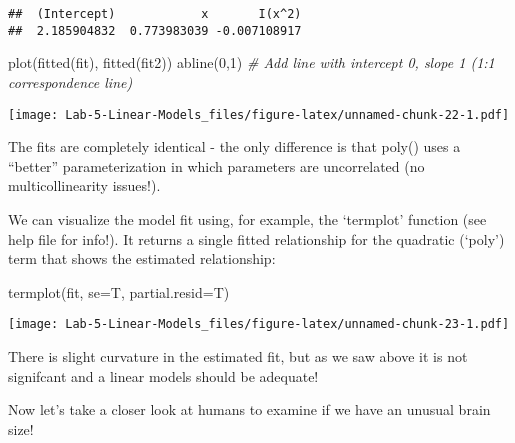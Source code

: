 \documentclass[
]{article}
\newenvironment{Shaded}{\begin{snugshade}}{\end{snugshade}}
\newcommand{\AttributeTok}[1]{\textcolor[rgb]{0.77,0.63,0.00}{#1}}
\newcommand{\CommentTok}[1]{\textcolor[rgb]{0.56,0.35,0.01}{\textit{#1}}}
\newcommand{\DecValTok}[1]{\textcolor[rgb]{0.00,0.00,0.81}{#1}}
\newcommand{\FunctionTok}[1]{\textcolor[rgb]{0.00,0.00,0.00}{#1}}
\newcommand{\NormalTok}[1]{#1}
\newcommand{\OtherTok}[1]{\textcolor[rgb]{0.56,0.35,0.01}{#1}}
\newcommand{\SpecialCharTok}[1]{\textcolor[rgb]{0.00,0.00,0.00}{#1}}
\newcommand{\StringTok}[1]{\textcolor[rgb]{0.31,0.60,0.02}{#1}}
\begin{document}
\begin{verbatim}
##  (Intercept)            x       I(x^2) 
##  2.185904832  0.773983039 -0.007108917
\end{verbatim}

\begin{Shaded}
\begin{Highlighting}[]
\FunctionTok{plot}\NormalTok{(}\FunctionTok{fitted}\NormalTok{(fit), }\FunctionTok{fitted}\NormalTok{(fit2))}
\FunctionTok{abline}\NormalTok{(}\DecValTok{0}\NormalTok{,}\DecValTok{1}\NormalTok{)        }\CommentTok{\# Add line with intercept 0, slope 1 (1:1 correspondence line)}
\end{Highlighting}
\end{Shaded}

\texttt{[image: Lab-5-Linear-Models\_files/figure-latex/unnamed-chunk-22-1.pdf]}

The fits are completely identical - the only difference is that poly()
uses a ``better'' parameterization in which parameters are uncorrelated
(no multicollinearity issues!).

We can visualize the model fit using, for example, the `termplot'
function (see help file for info!). It returns a single fitted
relationship for the quadratic (`poly') term that shows the estimated
relationship:

\begin{Shaded}
\begin{Highlighting}[]
\FunctionTok{termplot}\NormalTok{(fit, }\AttributeTok{se=}\NormalTok{T, }\AttributeTok{partial.resid=}\NormalTok{T)}
\end{Highlighting}
\end{Shaded}

\texttt{[image: Lab-5-Linear-Models\_files/figure-latex/unnamed-chunk-23-1.pdf]}

There is slight curvature in the estimated fit, but as we saw above it
is not signifcant and a linear models should be adequate!

Now let's take a closer look at humans to examine if we have an unusual
brain size!

\begin{Shaded}
\end{Shaded}
\end{document}
